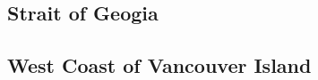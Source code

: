 \subsection{Strait of Geogia}
\begin{multicols}{2}

\tiny
\begin{alltt}
 
\end{alltt}
\normalsize

\tiny
\begin{alltt}
 
\end{alltt}
\normalsize

\end{multicols}
\clearpage

\subsection{West Coast of Vancouver Island}
\begin{multicols}{2}

\tiny
\begin{alltt}
 
\end{alltt}
\normalsize

\tiny
\begin{alltt}
 
\end{alltt}
\normalsize

\end{multicols}
\clearpage


